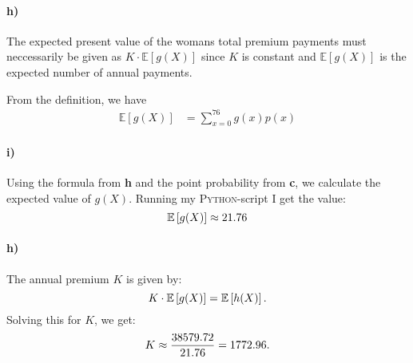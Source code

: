 \documentclass[a4paper]{article}
\theoremstyle{definition}
\begin{document}
\paragraph{h)}
The expected present value of the womans total premium payments must
neccessarily be given as $K \cdot \mathbb{E}\left[ g(X) \right]$ since $K$ is
constant and $\mathbb{E}\left[ g(X) \right]$ is the expected number of annual
payments.

From the definition, we have
\begin{align*}
  \label{eq:}
  \mathbb{E}\left[ g(X) \right] &= \sum_{x=0}^{76}g(x)p(x)
\end{align*}

\paragraph{i)}
Using the formula from \textbf{h} and the point probability from \textbf{c}, we
calculate the expected value of $g(X)$.  Running my \textsc{Python}-script I
get the value:
\begin{equation}
  \notag
  \mathbb{E}\left[ g(X) \right] \approx 21.76
\end{equation}
\paragraph{h)}

The annual premium $K$ is given by:
\begin{equation}
  \notag
  K \cdot \mathbb{E}\left[ g(X) \right] = \mathbb{E}\left[ h(X) \right].
\end{equation}
Solving this for $K$, we get:
\begin{equation}
  \notag
  K \approx \frac{38579.72}{21.76} = 1772.96.
\end{equation}
\end{document}
